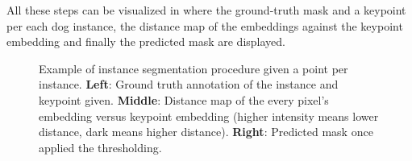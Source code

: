 All these steps can be visualized in  where the ground-truth mask and a keypoint per each dog instance, the distance map of the embeddings against the keypoint embedding and finally the predicted mask are displayed.

\begin{figure}[h]
  \centering
  \caption{Example of instance segmentation procedure given a point per instance.
  \textbf{Left}: Ground truth annotation of the instance and keypoint given.
  \textbf{Middle}: Distance map of the every pixel's embedding versus keypoint embedding (higher intensity means lower distance, dark means higher distance).
  \textbf{Right}: Predicted mask once applied the thresholding. }
  \label{fig:instance_segmentation}
\end{figure}

